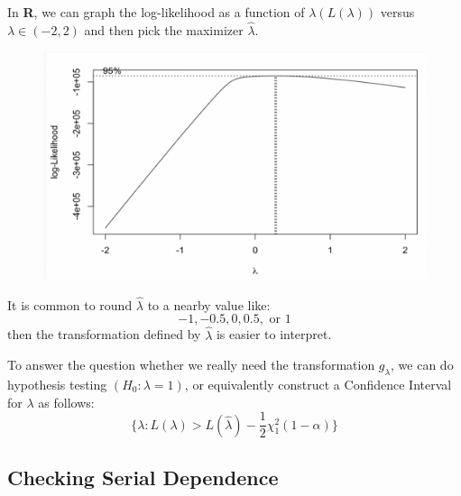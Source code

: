 \documentclass[11pt,a4paper]{article}
\begin{document}
In \textbf{R}, we can graph the log-likelihood as a function of $\lambda (L(\lambda))$ versus $\lambda\in (−2, 2)$ and then pick the maximizer $\hat{\lambda}$.\\
\begin{center}\begin{figure}[htbp]
    \centering
    \includegraphics[scale=0.5]{check8.png}
    \caption{}
    \label{}
\end{figure}\end{center}
It is common to round $\hat{\lambda}$ to a nearby value like:
$$−1, −0.5, 0, 0.5, \text{ or } 1 $$then the transformation deﬁned by $\hat{\lambda}$ is easier to interpret.

To answer the question whether we really need the transformation $g_\lambda$, we can do hypothesis testing $(H_0 : \lambda = 1)$, or equivalently construct a Conﬁdence Interval for $\lambda$ as follows:
$$\{\lambda: L(\lambda)>L(\hat{\lambda})-\frac{1}{2}\chi_1^2(1-\alpha)  \}$$

















\subsection{Checking Serial Dependence}
\end{document}
